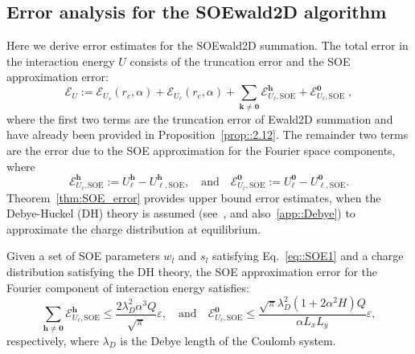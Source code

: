 \subsection{Error analysis for the SOEwald2D algorithm}\label{subsec::errSOEwald2D}
Here we derive error estimates for the SOEwald2D summation. 
The total error in the interaction energy $U$ consists of the truncation error and the SOE approximation error:
\begin{equation}
	\mathscr{E}_{U} := \mathscr{E}_{U_{s}}(r_c, \alpha) + \mathscr{E}_{U_{\ell}}(r_c, \alpha) + \sum_{\bm{k}\neq\bm{0}}\mathscr{E}_{U_{\ell},\text{SOE}}^{ \bm{h}} + \mathscr{E}_{U_{\ell},\text{SOE}}^{\bm{0}}\;,
\end{equation}
where the first two terms are the truncation error of Ewald2D summation and have already been provided in Proposition~\ref{prop::2.12}. 
The remainder two terms are the error due to the SOE approximation for the Fourier space components, where
\begin{equation}
	\mathscr{E}_{U_{\ell},\text{SOE}}^{\bm{h}}:=U_{\ell}^{\bm{h}}-U_{\ell,\text{SOE}}^{\bm{h}},\quad \text{and}\quad \mathscr{E}_{U_{\ell},\text{SOE}}^{\bm{0}}:=U_{\ell}^{\bm{0}}- U_{\ell,\text{SOE}}^{\bm{0}}.
\end{equation}
Theorem~\ref{thm:SOE_error} provides  upper bound error estimates, when the Debye-H$\ddot{\text{u}}$ckel (DH) theory is assumed (see~\cite{levin2002electrostatic}, and also~\ref{app::Debye}) to approximate the charge distribution at equilibrium.

\begin{thm}
	\label{thm:SOE_error}
	Given a set of SOE parameters $w_l$ and $s_l$ satisfying Eq.~\eqref{eq::SOE1} and a charge distribution satisfying the DH theory, the SOE approximation error for the Fourier component of interaction energy satisfies:
	\begin{equation}\sum_{\bm{h}\neq\bm{0}}\mathscr{E}_{U_{\ell},\text{SOE}}^{\bm{h}} \leq \frac{2 \lambda_D^2 \alpha^3Q}{\sqrt{\pi}}\varepsilon,
		\quad \text{and} \quad
		\mathscr{E}_{U_{\ell},\text{SOE}}^{\bm{0}} \leq \frac{\sqrt{\pi} \lambda_D^2 (1+2\alpha^2H)Q}{\alpha L_xL_y}\varepsilon,
		\label{eq::51}
	\end{equation}
	respectively, where $\lambda_D$ is the Debye length of the Coulomb system. 
\end{thm}

